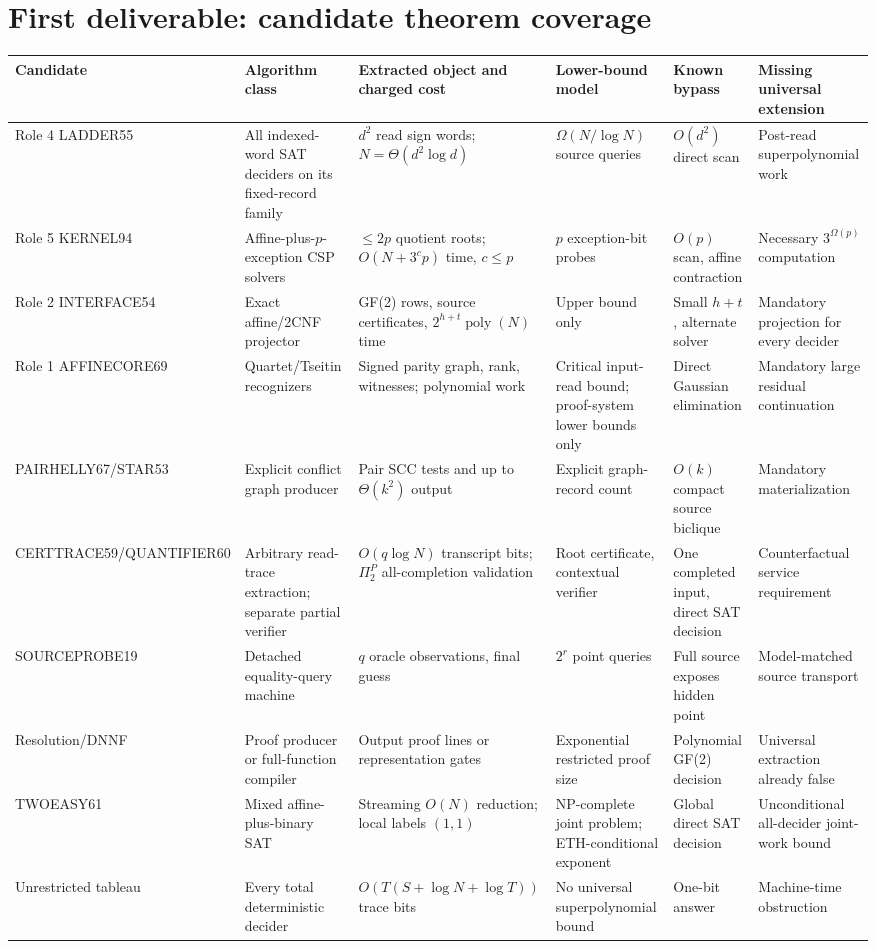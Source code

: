 \documentclass[11pt]{article}
\begin{document}
\section{First deliverable: candidate theorem coverage}
\begingroup\scriptsize
\renewcommand{\arraystretch}{1.25}
\begin{tabularx}{\linewidth}{@{}p{.8in}p{.95in}p{1.22in}p{1.2in}X X@{}}
\toprule
Candidate & Algorithm class & Extracted object and charged cost & Lower-bound model & Known bypass & Missing universal extension\\
\midrule
Role 4 LADDER55 & All indexed-word SAT deciders on its fixed-record family & $d^2$ read sign words; $N=\Theta(d^2\log d)$ & $\Omega(N/\log N)$ source queries & $O(d^2)$ direct scan & Post-read superpolynomial work\\
Role 5 KERNEL94 & Affine-plus-$p$-exception CSP solvers & $\le2p$ quotient roots; $O(N+3^cp)$ time, $c\le p$ & $p$ exception-bit probes & $O(p)$ scan, affine contraction & Necessary $3^{\Omega(p)}$ computation\\
Role 2 INTERFACE54 & Exact affine/2CNF projector & GF(2) rows, source certificates, $2^{h+t}\operatorname{poly}(N)$ time & Upper bound only & Small $h+t$, alternate solver & Mandatory projection for every decider\\
Role 1 AFFINECORE69 & Quartet/Tseitin recognizers & Signed parity graph, rank, witnesses; polynomial work & Critical input-read bound; proof-system lower bounds only & Direct Gaussian elimination & Mandatory large residual continuation\\
PAIRHELLY67/STAR53 & Explicit conflict graph producer & Pair SCC tests and up to $\Theta(k^2)$ output & Explicit graph-record count & $O(k)$ compact source biclique & Mandatory materialization\\
CERTTRACE59/QUANTIFIER60 & Arbitrary read-trace extraction; separate partial verifier & $O(q\log N)$ transcript bits; $\Pi_2^P$ all-completion validation & Root certificate, contextual verifier & One completed input, direct SAT decision & Counterfactual service requirement\\
SOURCEPROBE19 & Detached equality-query machine & $q$ oracle observations, final guess & $2^r$ point queries & Full source exposes hidden point & Model-matched source transport\\
Resolution/DNNF & Proof producer or full-function compiler & Output proof lines or representation gates & Exponential restricted proof size & Polynomial GF(2) decision & Universal extraction already false\\
TWOEASY61 & Mixed affine-plus-binary SAT & Streaming $O(N)$ reduction; local labels $(1,1)$ & NP-complete joint problem; ETH-conditional exponent & Global direct SAT decision & Unconditional all-decider joint-work bound\\
Unrestricted tableau & Every total deterministic decider & $O(T(S+\log N+\log T))$ trace bits & No universal superpolynomial bound & One-bit answer & Machine-time obstruction\\
\bottomrule
\end{tabularx}
\endgroup
\end{document}
